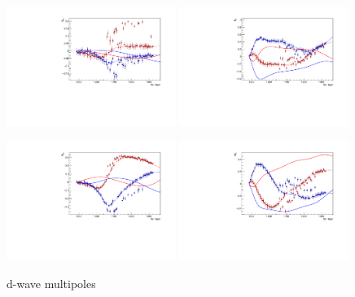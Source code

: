\documentclass[a4paper,12pt]{report}
\begin{document}
\begin{figure}
  \begin{center}
    \centerline{
    \includegraphics[width=0.49\textwidth]{plots.0/E2p.pdf}
    \includegraphics[width=0.49\textwidth]{plots.0/E2m.pdf}
    }
    \centerline{
    \includegraphics[width=0.49\textwidth]{plots.0/M2p.pdf}
    \includegraphics[width=0.49\textwidth]{plots.0/M2m.pdf}
    }
    \caption{d-wave multipoles}
  \end{center}
\end{figure}
\end{document}
